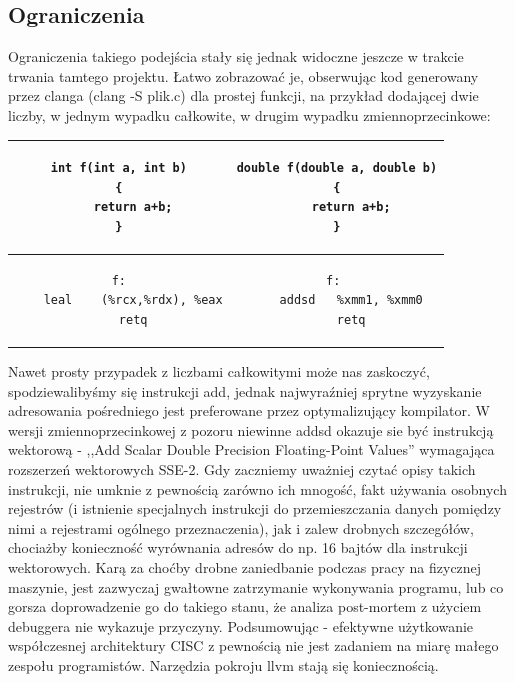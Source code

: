 \subsection{Ograniczenia}
Ograniczenia takiego podejścia stały się jednak widoczne jeszcze w trakcie trwania tamtego projektu. Łatwo zobrazować je, obserwując kod generowany przez clanga (clang -S plik.c) dla prostej funkcji, na przykład dodającej dwie liczby, w jednym wypadku całkowite, w drugim wypadku zmiennoprzecinkowe:
\begin{center}
\begin{tabular}{|c | c|}
\hline
\begin{lstlisting}
int f(int a, int b)
{
    return a+b;
}
\end{lstlisting}
&
\begin{lstlisting}
double f(double a, double b)
{
    return a+b;
}
\end{lstlisting}
\\ \hline
\begin{lstlisting}
f:
	leal	(%rcx,%rdx), %eax
	retq
\end{lstlisting}
&
\begin{lstlisting}
f: 
	addsd	%xmm1, %xmm0
	retq
\end{lstlisting}
\\ \hline
\end{tabular}
\end{center}
Nawet prosty przypadek z liczbami całkowitymi może nas zaskoczyć, spodziewalibyśmy się instrukcji add, jednak najwyraźniej sprytne wyzyskanie adresowania pośredniego jest preferowane przez optymalizujący kompilator. W wersji zmiennoprzecinkowej z pozoru niewinne addsd okazuje sie być instrukcją wektorową - ,,Add Scalar Double Precision Floating-Point Values''\cite{ADDSD_instr} wymagająca rozszerzeń wektorowych SSE-2. Gdy zaczniemy uważniej czytać opisy takich instrukcji, nie umknie z pewnością zarówno ich mnogość, fakt używania osobnych rejestrów (i istnienie specjalnych instrukcji do przemieszczania danych pomiędzy nimi a rejestrami ogólnego przeznaczenia), jak i zalew drobnych szczegółów, chociażby konieczność wyrównania adresów do np. 16 bajtów dla instrukcji wektorowych. Karą za choćby drobne zaniedbanie podczas pracy na fizycznej maszynie, jest zazwyczaj gwałtowne zatrzymanie wykonywania programu, lub co gorsza doprowadzenie go do takiego stanu, że analiza post-mortem z użyciem debuggera nie wykazuje przyczyny. Podsumowując - efektywne użytkowanie współczesnej architektury CISC z pewnością nie jest zadaniem na miarę małego zespołu programistów. Narzędzia pokroju llvm stają się koniecznością.

